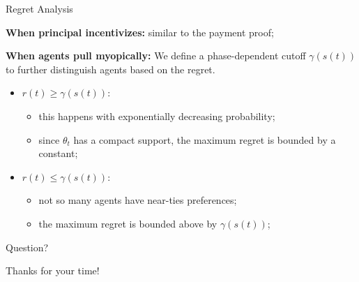 \documentclass[serif]{beamer}
\begin{document}
\begin{frame}{Regret Analysis}

\textbf{When principal incentivizes:} similar to the payment proof;
\vspace{0.5cm}

\textbf{When agents pull myopically:} We define a phase-dependent cutoff $\gamma(s(t))$ to further distinguish agents based on the regret.
\begin{itemize}[label=\textbullet]
\item $r(t)\geq \gamma(s(t))$:
\begin{itemize}[label=$\star$]
\item this happens with exponentially decreasing probability;
\item since $\theta_t$ has a compact support, the maximum regret is bounded by a constant;
\end{itemize}
\item $r(t)\leq \gamma(s(t))$:
\begin{itemize}[label=$\star$] 
\item not so many agents have near-ties preferences; 
\item the maximum regret is bounded above by $\gamma(s(t))$;
\end{itemize}
\end{itemize}

\end{frame}
\begin{frame}{Question?}
\begin{center}
\Huge{Thanks for your time!}
\end{center}
\end{frame}
\end{document}
